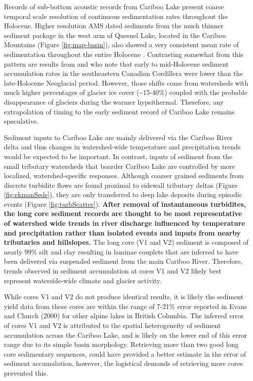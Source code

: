 \documentclass[Royal,times,doublespace,sageh]{sagej}
\begin{document}
Records of sub-bottom acoustic records from Cariboo Lake present coarse
temporal scale resolution of continuous sedimentation rates throughout
the Holocene. Higher resolution AMS dated sediments from the much
thinner sediment package in the west arm of Quesnel Lake, located in the
Cariboo Mountains (Figure \ref{fig:map-basin}), also showed a very
consistent mean rate of sedimentation throughout the entire Holocene
\citep{Gilbert2012}. Contrasting somewhat from this pattern are results
from \citet{Menounos2004} and \citet{Desloges1999} who note that early
to mid-Holocene sediment accumulation rates in the southeastern Canadian
Cordillera were lower than the late-Holocene Neoglacial period. However,
those shifts come from watersheds with much higher percentages of
glacier ice cover (\textasciitilde15-40\%) coupled with the probable
disappearance of glaciers during the warmer hypsithermal. Therefore, any
extrapolation of timing to the early sediment record of Cariboo Lake
remains speculative.

Sediment inputs to Cariboo Lake are mainly delivered via the Cariboo
River delta and thus changes in watershed-wide temperature and
precipitation trends would be expected to be important. In contrast,
inputs of sediment from the small tributary watersheds that boarder
Cariboo Lake are controlled by more localized, watershed-specific
responses. Although coarser grained sediments from discrete turbidite
flows are found proximal to sidewall tributary deltas (Figure
\ref{fig:ekmanSeds}), they are only transferred to deep lake deposits
during episodic events (Figure \ref{fig:turbScatter}). \textbf{After
removal of instantaneous turbidites, the long core sediment records are
thought to be most representative of watershed wide trends in river
discharge influenced by temperature and precipitation rather than
isolated events and inputs from nearby tributaries and hillslopes.} The
long core (V1 and V2) sediment is composed of nearly 99\% silt and clay
resulting in laminae couplets that are inferred to have been delivered
via suspended sediment from the main Cariboo River. Therefore, trends
observed in sediment accumulation at cores V1 and V2 likely best
represent waterside-wide climate and glacier activity.

While cores V1 and V2 do not produce identical results, it is likely the
sediment yield data from these cores are within the range of 7-21\%
error reported in Evans and Church (2000) for other alpine lakes in
British Columbia. The inferred error of cores V1 and V2 is attributed to
the spatial heterogeneity of sediment accumulation across the Cariboo
Lake, and is likely on the lower end of this error range due to its
simple basin morphology. Retrieving more than two good long core
sedimentary sequences, could have provided a better estimate in the
error of sediment accumulation, however, the logistical demands of
retrieving more cores prevented this.
\end{document}
